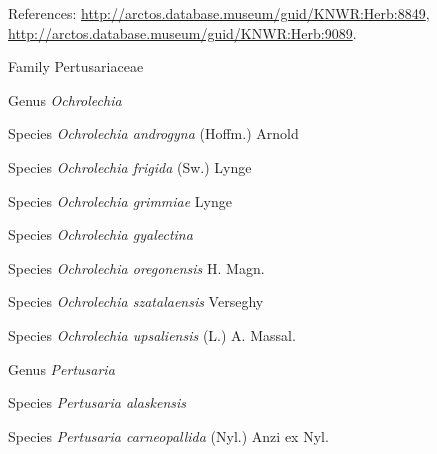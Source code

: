 \documentclass[9pt, article]{memoir}
\begin{document}
\begin{multicols}{2}
\vspace{6pt}References: 
\url{http://arctos.database.museum/guid/KNWR:Herb:8849}, 
\url{http://arctos.database.museum/guid/KNWR:Herb:9089}.

\vspace{6pt}\noindent\hspace{24pt}Family Pertusariaceae


\vspace{6pt}\noindent\hspace{30pt}Genus \textit{Ochrolechia}


\vspace{6pt}\noindent\hspace{36pt}Species \textit{Ochrolechia androgyna} (Hoffm.) Arnold


\vspace{6pt}\noindent\hspace{36pt}Species \textit{Ochrolechia frigida} (Sw.) Lynge


\vspace{6pt}\noindent\hspace{36pt}Species \textit{Ochrolechia grimmiae} Lynge


\vspace{6pt}\noindent\hspace{36pt}Species \textit{Ochrolechia gyalectina}


\vspace{6pt}\noindent\hspace{36pt}Species \textit{Ochrolechia oregonensis} H. Magn.


\vspace{6pt}\noindent\hspace{36pt}Species \textit{Ochrolechia szatalaensis} Verseghy


\vspace{6pt}\noindent\hspace{36pt}Species \textit{Ochrolechia upsaliensis} (L.) A. Massal.


\vspace{6pt}\noindent\hspace{30pt}Genus \textit{Pertusaria}


\vspace{6pt}\noindent\hspace{36pt}Species \textit{Pertusaria alaskensis}


\vspace{6pt}\noindent\hspace{36pt}Species \textit{Pertusaria carneopallida} (Nyl.) Anzi ex Nyl.



\end{multicols}
\end{document}
